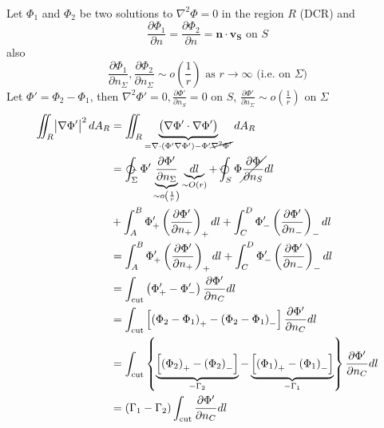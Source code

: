 \begin{itemize}
\begin{enumerate}[label = (\arabic*)]
\\
Let $\Phi_1$ and $\Phi_2$ be two solutions to $\nabla^2\Phi = 0$ in the region $R$ (DCR) and 
\[
\frac{\partial\Phi_1}{\partial n} = \frac{\partial\Phi_2}{\partial n} = \mathbf{n}\cdot\mathbf{v_S}\text{ on }S
\]
also
\[
\frac{\partial\Phi_1}{\partial n_\Sigma},\frac{\partial\Phi_2}{\partial n_\Sigma}\sim o\left(\frac{1}{r}\right)\text{ as }r\to\infty\text{ (i.e. on $\Sigma$)}
\]
Let $\Phi'=\Phi_2-\Phi_1$, then $\displaystyle\nabla^2\Phi'=0,\frac{\partial\Phi'}{\partial n_S} = 0$ on $S$, $\displaystyle\frac{\partial\Phi'}{\partial n_\Sigma}\sim o\left(\frac{1}{r}\right)$ on $\Sigma$
\begin{align*}
\iint_R\abs{\nabla\Phi'}^2dA_R
&= \iint_R\underbrace{\left(\nabla\Phi'\cdot\nabla\Phi'\right)}_{=\nabla\cdot\left(\Phi'\nabla\Phi'\right)-\Phi'\cancel{\nabla^2\Phi'}}dA_R\\
&= \ointctrclockwise_\Sigma\Phi'\underbrace{\frac{\partial\Phi'}{\partial n_\Sigma}}_{\sim o\left(\frac{1}{r}\right)}\underbrace{dl}_{\sim O(r)} + \varointctrclockwise_S\Phi\cancel{\frac{\partial\Phi}{\partial n_S}}dl \\
&+ \int_A^B\Phi'_+\left(\frac{\partial\Phi'}{\partial n_+}\right)_+dl + \int_C^D\Phi'_-\left(\frac{\partial\Phi'}{\partial n_-}\right)_-dl \\
&= \int_A^B\Phi'_+\left(\frac{\partial\Phi'}{\partial n_+}\right)_+dl + \int_C^D\Phi'_-\left(\frac{\partial\Phi'}{\partial n_-}\right)_-dl \\
&= \int_{\text{cut}}\left(\Phi'_+-\Phi'_-\right)\frac{\partial\Phi'}{\partial n_C}dl \\
&= \int_{\text{cut}}\left[\left(\Phi_2-\Phi_1\right)_+ - \left(\Phi_2-\Phi_1\right)_-\right]\frac{\partial\Phi'}{\partial n_C}dl \\
&= \int_{\text{cut}}\left\{\underbrace{\left[\left(\Phi_2\right)_+ -\left(\Phi_2\right)_-\right]}_{-\Gamma_2} - \underbrace{\left[\left(\Phi_1\right)_+ - \left(\Phi_1\right)_-\right]}_{-\Gamma_1}\right\}\frac{\partial\Phi'}{\partial n_C}dl \\
&= \left(\Gamma_1-\Gamma_2\right)\int_{\text{cut}}\frac{\partial\Phi'}{\partial n_C}dl
\end{align*}

\end{enumerate}
\end{itemize}
